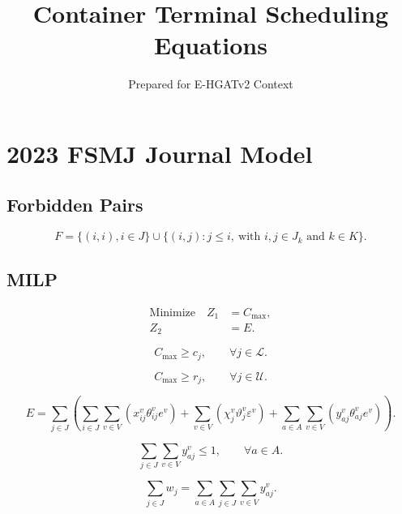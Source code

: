 \documentclass[11pt]{article}
\title{Container Terminal Scheduling Equations}
\author{Prepared for E-HGATv2 Context}
\date{}
\begin{document}
\maketitle

\section{2023 FSMJ Journal Model}

\subsection{Forbidden Pairs}

\[
F =
\{(i,i), i \in J\}
\cup
\{(i,j) : j \le i,\ \text{with } i,j \in J_k \text{ and } k \in K\}.
\]

\subsection{MILP}

\begin{equation}
\begin{aligned}
\text{Minimize}\quad Z_1 &= C_{\max},\\
Z_2 &= E.
\end{aligned}
\tag{1}
\end{equation}

\begin{equation}
C_{\max} \ge c_j, \qquad \forall j \in \mathcal{L}.
\tag{2}
\end{equation}

\begin{equation}
C_{\max} \ge r_j, \qquad \forall j \in \mathcal{U}.
\tag{3}
\end{equation}

\begin{equation}
E =
\sum_{j\in J}
\left(
    \sum_{i\in J}\sum_{v\in V}
        \left(x_{ij}^{v}\theta_{ij}^{v}e^{v}\right)
    +
    \sum_{v\in V}
        \left(\chi_{j}^{v}\vartheta_{j}^{v}\varepsilon^{v}\right)
    +
    \sum_{a\in A}\sum_{v\in V}
        \left(y_{aj}^{v}\theta_{aj}^{v}e^{v}\right)
\right).
\tag{4}
\end{equation}

\begin{equation}
\sum_{j\in J}\sum_{v\in V} y_{aj}^{v} \le 1,
\qquad \forall a \in A.
\tag{5}
\end{equation}

\begin{equation}
\sum_{j\in J} w_j
=
\sum_{a\in A}\sum_{j\in J}\sum_{v\in V} y_{aj}^{v}.
\tag{6}
\end{equation}
\end{document}

